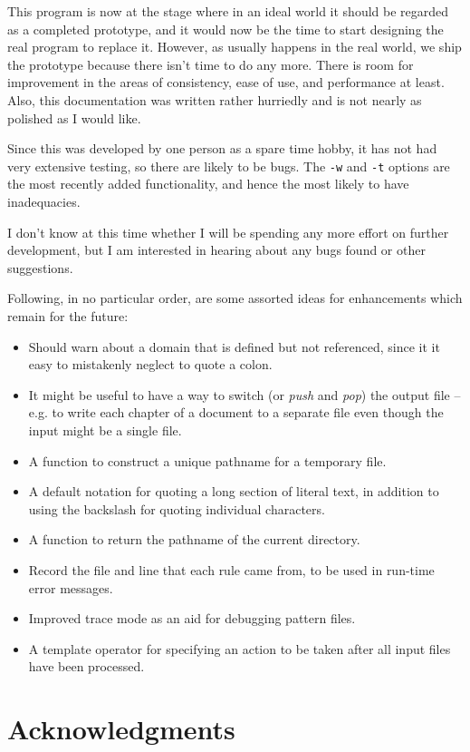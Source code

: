 This program is now at the stage where in an ideal world it should be
regarded as a completed prototype, and it would now be the time to start
designing the real program to replace it.  However, as usually happens
in the real world, we ship the prototype because there isn't time to do
any more.  There is room for improvement in the areas of consistency,
ease of use, and performance at least.
Also, this documentation was written rather hurriedly and is not nearly as
polished as I would like.

Since this was developed by one person as a spare time hobby, it has not
had very extensive testing, so there are likely to be bugs.  The
\verb/-w/ and \verb/-t/ options are the most recently added
functionality, and hence the most likely to have inadequacies.

I don't know at this time whether I will be spending any more effort on
further development, but I am interested in hearing about any bugs found
or other suggestions.

Following, in no particular order, are some assorted ideas for
enhancements which remain for the future:
\begin{itemize}
\item Should warn about a domain that is defined but not referenced,
since it it easy to mistakenly neglect to quote a colon.
\item It might be useful to have a way to switch 
(or {\em push} and {\em pop}) the output
file -- e.g. to write each chapter of a document to a separate file
even though the input might be a single file.
\item A function to construct a unique pathname for a temporary file.
\item A default notation for quoting a long section of
literal text, in addition to using the backslash for quoting individual
characters.
\item A function to return the pathname of the current directory.
\item Record the file and line that each rule came from, to be used in
run-time error messages.
\item Improved trace mode as an aid for debugging pattern files.
\item A template operator for specifying an action to be taken after all
input files have been processed.
\end{itemize}

\section{Acknowledgments}

